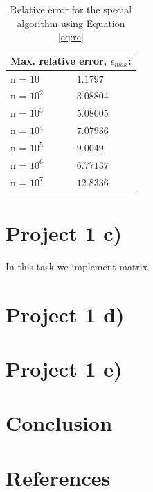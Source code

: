 \documentclass{article}
\begin{document}
\begin{table}[]
\centering
\begin{tabular}{ll}
\multicolumn{2}{c}{\textbf{Max. relative error, $\epsilon_{max}$:}} \\ \hline
n = $10$                                  & $1.1797$                                \\
n = $10^2$                                & $3.08804$                               \\
n = $10^3$                                & $5.08005$                               \\
n = $10^4$                                & $7.07936$                               \\
n = $10^5$                                & $9.0049$                                \\
n = $10^6$                                & $6.77137$                               \\
n = $10^7$                                & $12.8336$                              
\end{tabular}
\label{tab:2}
\caption{Relative error for the special algorithm using Equation \ref{eq:re}}
\end{table}



\section{Project 1 c)}
In this task we implement matrix 

\section{Project 1 d)}

\section{Project 1 e)}


\section{Conclusion}

\section{References}
\end{document}
